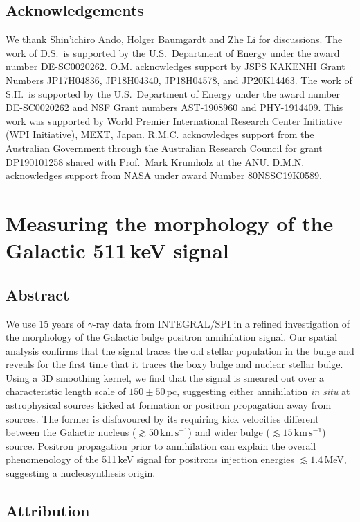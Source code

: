 \documentclass[doublespace,nopageskip]{VTthesis} %
\newcommand{\mrm}[1]{\mathrm{#1}}
\begin{document}
\section*{Acknowledgements}
We thank Shin'ichiro Ando, Holger Baumgardt and Zhe Li for discussions. The work of D.S.\ is supported by the U.S.\ Department of Energy under the award number DE-SC0020262. O.M. acknowledges support by JSPS KAKENHI Grant Numbers JP17H04836, JP18H04340, JP18H04578, and JP20K14463. The work of S.H.\ is supported by the U.S.\ Department of Energy under the award number DE-SC0020262 and NSF Grant numbers AST-1908960 and PHY-1914409. This work was supported by World Premier International Research Center Initiative (WPI Initiative), MEXT, Japan. R.M.C. acknowledges support from the Australian Government through the Australian Research Council for grant DP190101258 shared with Prof.~Mark Krumholz at the ANU. D.M.N. acknowledges support from NASA under award Number 80NSSC19K0589.

\chapter{Measuring the morphology of the Galactic 511\,keV signal} \label{ch:511keV}

\section{Abstract}

We use 15 years of $\gamma$-ray data from INTEGRAL/SPI in a refined investigation of the morphology of the Galactic bulge positron annihilation signal.
%
Our spatial analysis confirms that the signal traces the old stellar population in the bulge and reveals for the first time that it traces the 
boxy bulge and nuclear stellar bulge.
%
Using a 3D smoothing kernel, we find that the signal is smeared out over a characteristic length scale of $150 \pm 50$\,pc, suggesting either annihilation \textit{in situ} at astrophysical sources kicked at formation or positron propagation away from sources.
%
The former is disfavoured by its requiring kick velocities different between the Galactic nucleus ($\gtrsim 50\,\mrm{km\,s^{-1}}$) and  wider bulge ($\lesssim 15\,\mrm{km\,s^{-1}}$) source.
%
Positron propagation prior to annihilation can explain the overall phenomenology of the 511\,keV signal for positrons injection energies $\lesssim 1.4$\,MeV, suggesting a nucleosynthesis origin.

\section{Attribution}
\end{document}
